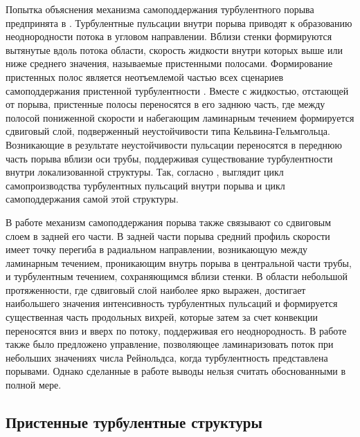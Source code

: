 Попытка объяснения механизма самоподдержания турбулентного порыва предпринята в \cite{Shimizu2009}. Турбулентные пульсации внутри порыва приводят к образованию неоднородности потока в угловом направлении. Вблизи стенки формируются вытянутые вдоль потока области, скорость жидкости внутри которых выше или ниже среднего значения, называемые пристенными полосами. Формирование пристенных полос является неотъемлемой частью всех сценариев самоподдержания пристенной турбулентности \cite{Hamilton1995, Waleffe1997, Schoppa2002}. Вместе с жидкостью, отстающей от порыва, пристенные полосы переносятся в его заднюю часть, где между полосой пониженной скорости и набегающим ламинарным течением формируется сдвиговый слой, подверженный неустойчивости типа Кельвина-Гельмгольца. Возникающие в результате неустойчивости пульсации переносятся в переднюю часть порыва вблизи оси трубы, поддерживая существование турбулентности внутри локализованной структуры. Так, согласно \cite{Shimizu2009}, выглядит цикл самопроизводства турбулентных пульсаций внутри порыва и цикл самоподдержания самой этой структуры. 

В работе \cite{Hof2010} механизм самоподдержания порыва также связывают со сдвиговым слоем в задней его части. В задней части порыва средний профиль скорости имеет точку перегиба в радиальном направлении, возникающую между ламинарным течением, проникающим внутрь порыва в центральной части трубы, и турбулентным течением, сохраняющимся вблизи стенки. В области небольшой протяженности, где сдвиговый слой наиболее ярко выражен, достигает наибольшего значения интенсивность турбулентных пульсаций и формируется существенная часть продольных вихрей, которые затем за счет конвекции переносятся вниз и вверх по потоку, поддерживая его неоднородность. В работе \cite{Hof2010} также было предложено управление, позволяющее ламинаризовать поток при небольших значениях числа Рейнольдса, когда турбулентность представлена порывами. Однако сделанные в работе выводы нельзя считать обоснованными в полной мере. 


	\subsection{Пристенные турбулентные структуры} \label{structure_subsection}

